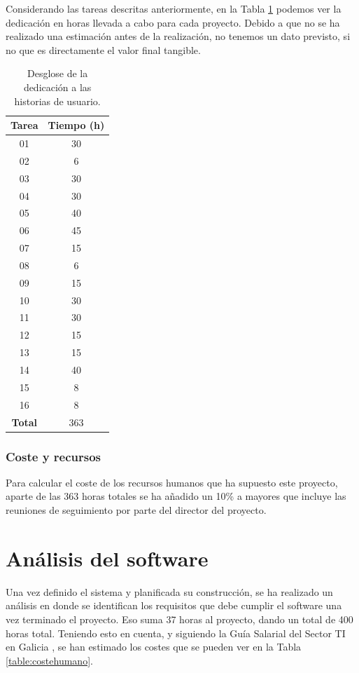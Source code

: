 Considerando las tareas descritas anteriormente, en la Tabla \ref{table:dedicacion} podemos ver la dedicación en horas llevada a cabo para cada proyecto. Debido a que no se ha realizado una estimación antes de la realización, no tenemos un dato previsto, si no que es directamente el valor final tangible.

\begin{table}[!h]
	\centering
	\begin{tabular}{ c c }
		\bfseries{Tarea} & \bfseries{Tiempo (h)} \\
		\hline
		01 & 30 \\
		02 & 6 \\
		03 & 30 \\
		04 & 30 \\
		05 & 40 \\
		06 & 45 \\
		07 & 15 \\
		08 & 6 \\
		09 & 15 \\
		10 & 30 \\
		11 & 30 \\
		12 & 15 \\
		13 & 15 \\
		14 & 40 \\
		15 & 8 \\
		16 & 8 \\
		\hline
		\bfseries{Total} & 363 \\
		\hline
	\end{tabular}
	\caption{Desglose de la dedicación a las historias de usuario.}
	\label{table:dedicacion}
\end{table}

\subsubsection{Coste y recursos}

Para calcular el coste de los recursos humanos que ha supuesto este proyecto, aparte de las 363 horas totales se ha añadido un 10\% a mayores que incluye las reuniones de seguimiento por parte del director del proyecto. 

\section{Análisis del software}

Una vez definido el sistema y planificada su construcción, se ha realizado un análisis en donde se identifican los requisitos que debe cumplir el software una vez terminado el proyecto. Eso suma 37 horas al proyecto, dando un total de 400 horas total. Teniendo esto en cuenta, y siguiendo la Guía Salarial del Sector TI en Galicia \cite{guia_galicia}, se han estimado los costes que se pueden ver en la Tabla \ref{table:costehumano}.

